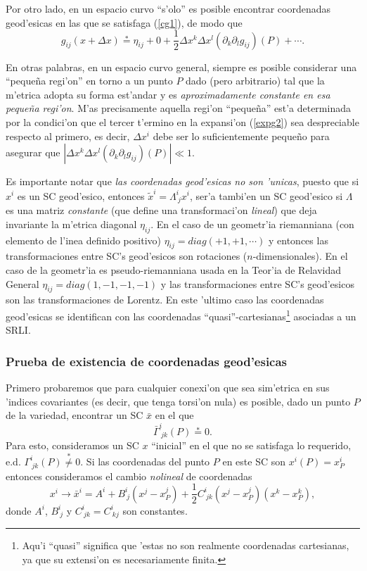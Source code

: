 Por otro lado, en un espacio curvo ``s'olo'' es posible encontrar coordenadas geod'esicas en las que se satisfaga (\ref{cg1}), de modo que
\begin{equation}
 g_{ij}(x+\Delta x)\stackrel{*}{=} \eta_{ij}+0+\frac{1}{2}\Delta x^k\Delta x^l(\partial_k\partial_lg_{ij})(P)+\cdots . \label{expg2}
\end{equation}

En otras palabras, en un espacio curvo general, siempre es posible considerar una ``peque\~na regi'on'' en torno a un punto $P$ dado (pero arbitrario) tal que la m'etrica adopta su forma est'andar y es \textit{aproximadamente constante en esa peque\~na regi'on}. M'as precisamente aquella regi'on ``peque\~na'' est'a determinada por la condici'on que el tercer t'ermino en la expansi'on (\ref{expg2}) sea despreciable respecto al primero, es decir, $\Delta x^i$ debe ser lo suficientemente peque\~no para asegurar que $\left|\Delta x^k\Delta x^l(\partial_k\partial_lg_{ij})(P)\right|\ll 1$.

Es importante notar que \textit{las coordenadas geod'esicas no son 'unicas}, puesto que si $x^i$ es un SC geod'esico, entonces $\tilde{x}^i=\Lambda^i_{\ j}x^i$, ser'a tambi'en un SC geod'esico si $\Lambda$ es una matriz \textit{constante} (que define una transformaci'on \textit{lineal}) que deja invariante la m'etrica diagonal $\eta_{ij}$. En el caso de un geometr'ia riemanniana (con elemento de l'inea definido positivo) $\eta_{ij}=diag(+1,+1,\cdots)$ y entonces las transformaciones entre SC's geod'esicos son rotaciones ($n$-dimensionales). En el caso de la geometr'ia es pseudo-riemanniana usada en la Teor'ia de Relavidad General $\eta_{ij}=diag(1,-1,-1,-1)$ y las transformaciones entre SC's geod'esicos son las transformaciones de Lorentz. En este 'ultimo caso las coordenadas geod'esicas se identifican con las coordenadas ``quasi''-cartesianas\footnote{Aqu'i ``quasi'' significa que 'estas no son realmente coordenadas cartesianas, ya que su extensi'on es necesariamente finita.} asociadas a un SRLI.

\subsubsection{Prueba de existencia de coordenadas geod'esicas}

Primero probaremos que para cualquier conexi'on que sea sim'etrica en sus 'indices covariantes (es decir, que tenga torsi'on nula) es posible, dado un punto $P$ de la variedad, encontrar un SC $\bar{x}$ en el que
\begin{equation}\label{ccgG}
\bar\Gamma^i_{\ jk}(P)\stackrel{*}{=}0.
\end{equation}
Para esto, consideramos un SC $x$ ``inicial'' en el que no se satisfaga lo requerido, e.d. $\Gamma^i_{\ jk}(P)\stackrel{*}{\neq}0$. Si las coordenadas del punto $P$ en este SC son $x^i(P)=x^i_P$ entonces consideramos el cambio \textit{nolineal} de coordenadas
\begin{equation}\label{tccg}
x^i\rightarrow \bar{x}^i=A^i+B^i_{\ j}(x^j-x^j_P)+\frac{1}{2}C^i_{\ jk}(x^j-x^j_P)(x^k-x^k_P),
\end{equation}
donde $A^i$, $B^i_{\ j}$ y $C^i_{\ jk}=C^i_{\ kj}$ son constantes.

